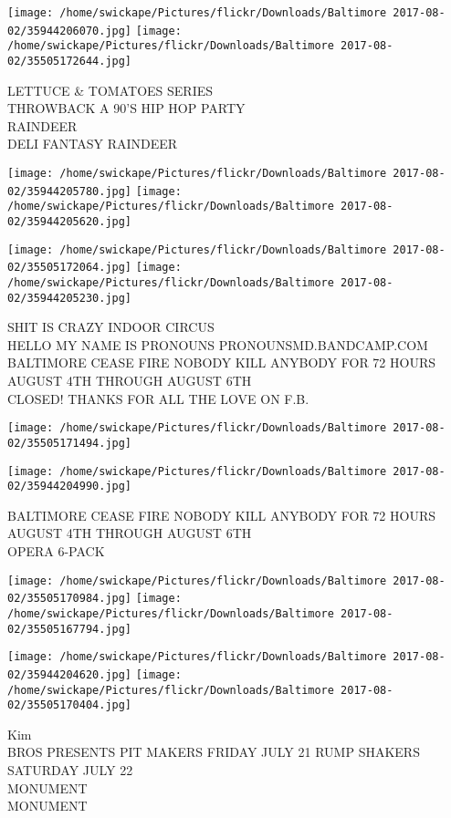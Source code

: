\documentclass[10pt,letterpaper]{article}
\begin{document}
\texttt{[image: /home/swickape/Pictures/flickr/Downloads/Baltimore 2017-08-02/35944206070.jpg]}
\texttt{[image: /home/swickape/Pictures/flickr/Downloads/Baltimore 2017-08-02/35505172644.jpg]}

LETTUCE \& TOMATOES SERIES\\
THROWBACK A 90'S HIP HOP PARTY\\
RAINDEER\\
DELI FANTASY RAINDEER
\pagebreak

\texttt{[image: /home/swickape/Pictures/flickr/Downloads/Baltimore 2017-08-02/35944205780.jpg]}
\texttt{[image: /home/swickape/Pictures/flickr/Downloads/Baltimore 2017-08-02/35944205620.jpg]}

\texttt{[image: /home/swickape/Pictures/flickr/Downloads/Baltimore 2017-08-02/35505172064.jpg]}
\texttt{[image: /home/swickape/Pictures/flickr/Downloads/Baltimore 2017-08-02/35944205230.jpg]}

SHIT IS CRAZY INDOOR CIRCUS\\
HELLO MY NAME IS PRONOUNS PRONOUNSMD.BANDCAMP.COM\\
BALTIMORE CEASE FIRE NOBODY KILL ANYBODY FOR 72 HOURS AUGUST 4TH THROUGH AUGUST 6TH\\
CLOSED! THANKS FOR ALL THE LOVE ON F.B.
\pagebreak

\texttt{[image: /home/swickape/Pictures/flickr/Downloads/Baltimore 2017-08-02/35505171494.jpg]}

\vspace{0.25in}
\texttt{[image: /home/swickape/Pictures/flickr/Downloads/Baltimore 2017-08-02/35944204990.jpg]}

BALTIMORE CEASE FIRE NOBODY KILL ANYBODY FOR 72 HOURS AUGUST 4TH THROUGH AUGUST 6TH\\
OPERA 6{-}PACK
\pagebreak

\texttt{[image: /home/swickape/Pictures/flickr/Downloads/Baltimore 2017-08-02/35505170984.jpg]}
\texttt{[image: /home/swickape/Pictures/flickr/Downloads/Baltimore 2017-08-02/35505167794.jpg]}

\texttt{[image: /home/swickape/Pictures/flickr/Downloads/Baltimore 2017-08-02/35944204620.jpg]}
\texttt{[image: /home/swickape/Pictures/flickr/Downloads/Baltimore 2017-08-02/35505170404.jpg]}

Kim\\
BROS PRESENTS PIT MAKERS FRIDAY JULY 21 RUMP SHAKERS SATURDAY JULY 22\\
MONUMENT\\
MONUMENT
\pagebreak
\end{document}
